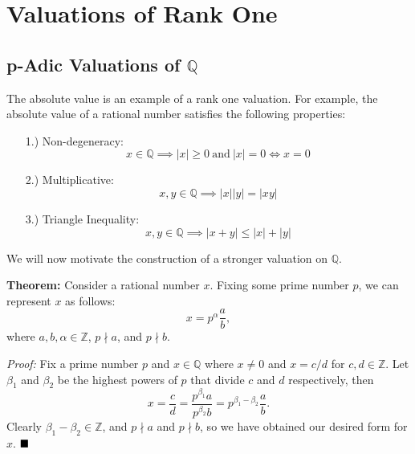 \documentclass[12pt]{article}
\newcommand{\Z}{\mathbb{Z}}
\newcommand{\Q}{\mathbb{Q}}
\newcommand{\vertb}[1]{\left\vert#1\right\vert}
\newcommand{\done}{\ensuremath{\strut\hfill\blacksquare}}
\begin{document}
\pagestyle{fancy}

\setlength{\parindent}{0in}
\setlength{\parskip}{0.25in}

\section{Valuations of Rank One}

\subsection{p-Adic Valuations of \( \Q \)}

The absolute value is an example of a rank one valuation.
For example, the absolute value of a rational number satisfies the following
properties:

\begin{itemize}
	\item[1.)] Non-degeneracy:
	\[
		x \in \Q \implies \vertb{x} \geq 0
		\ \text{and}\ 
		\vertb{x} = 0 \iff x = 0
	\]

	\item[2.)] Multiplicative:
	\[
		x,y \in \Q \implies \vertb{x} \vertb{y} = \vertb{xy}
	\]

	\item[3.)] Triangle Inequality:
	\[
		x,y \in \Q \implies \vertb{x + y} \leq \vertb{x} + \vertb{y}
	\]
\end{itemize}


We will now motivate the construction of a stronger valuation on \( \Q \).

\textbf{Theorem:} Consider a rational number \( x \).
Fixing some prime number \( p \), we can represent \( x \) as follows:
\[
	x = p^\alpha \frac{a}{b},
\]
where \( a,b,\alpha \in \Z \), \( p \nmid a \), and \( p \nmid b \).

\textit{Proof:} Fix a prime number \( p \) and \( x \in \Q \) where
\( x \ne 0 \) and \( x = c/d \) for \( c,d \in \Z \).
Let \( \beta_1 \) and \( \beta_2 \) be the highest powers of \( p \) that
divide \( c \) and \( d \) respectively, then
\[
	x = \frac{c}{d} = \frac{p^{\beta_1}a}{p^{\beta_2}b}
	= p^{\beta_1 - \beta_2} \frac{a}{b}.
\]
Clearly \( \beta_1 - \beta_2 \in \Z \), and \( p \nmid a \) and
\( p \nmid b \), so we have obtained our desired form for \( x \).
\done
\end{document}
